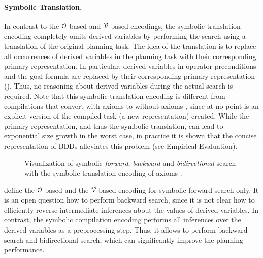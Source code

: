 \paragraph{Symbolic Translation.}
In contrast to the $\mathcal O$-based and $\mathcal V$-based encodings, the symbolic translation encoding completely omits derived variables by performing the search using a translation of the original planning task.
The idea of the translation is to replace all occurrences of derived variables in the planning task with their corresponding primary representation. In particular, derived variables in operator preconditions and the goal formula are replaced by their corresponding primary representation (). Thus, no reasoning about derived variables during the actual search is required.
%
Note that this symbolic translation encoding is different from compilations that convert \pddl{} with axioms to \pddl{} without axioms \autocite{gazen-knoblock-ecp1997,thiebaux-et-al-aij2005}, since at no point is an explicit version of the compiled task (a new \pddl{} representation) created. 
While the primary representation, and thus the symbolic translation, can lead to exponential size growth in the worst case, in practice it is shown that the concise representation of BDDs alleviates this problem (see Empirical Evaluation).
\medskip

\begin{figure}[t]
    \centering
    
    \caption[Symbolic translation encoding of axioms.]{
        Visualization of symbolic \emph{forward}, \emph{backward} and \emph{bidirectional} search with the symbolic translation encoding of axioms \autocite{speck-et-al-icaps2019}.\label{fig:axiom_option3}}
\end{figure}

\textcite{speck-et-al-icaps2019} define the $\mathcal O$-based and the $\mathcal V$-based encoding for symbolic forward search only. It is an open question how to perform backward search, since it is not clear how to efficiently reverse intermediate inferences about the values of derived variables.
In contrast, the symbolic compilation encoding performs all inferences over the derived variables as a preprocessing step. 
Thus, it allows to perform backward search and bidirectional search, which can significantly improve the planning performance.


